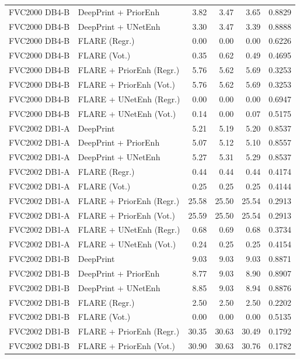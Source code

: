 {\begin{longtable}{llrrrr}
FVC2000 DB4-B & DeepPrint + PriorEnh & 3.82 & 3.47 & 3.65 & 0.8829 \\
FVC2000 DB4-B & DeepPrint + UNetEnh & 3.30 & 3.47 & 3.39 & 0.8888 \\
FVC2000 DB4-B & FLARE (Regr.) & 0.00 & 0.00 & 0.00 & 0.6226 \\
FVC2000 DB4-B & FLARE (Vot.) & 0.35 & 0.62 & 0.49 & 0.4695 \\
FVC2000 DB4-B & FLARE + PriorEnh (Regr.) & 5.76 & 5.62 & 5.69 & 0.3253 \\
FVC2000 DB4-B & FLARE + PriorEnh (Vot.) & 5.76 & 5.62 & 5.69 & 0.3253 \\
FVC2000 DB4-B & FLARE + UNetEnh (Regr.) & 0.00 & 0.00 & 0.00 & 0.6947 \\
FVC2000 DB4-B & FLARE + UNetEnh (Vot.) & 0.14 & 0.00 & 0.07 & 0.5175 \\
\midrule
FVC2002 DB1-A & DeepPrint & 5.21 & 5.19 & 5.20 & 0.8537 \\
FVC2002 DB1-A & DeepPrint + PriorEnh & 5.07 & 5.12 & 5.10 & 0.8557 \\
FVC2002 DB1-A & DeepPrint + UNetEnh & 5.27 & 5.31 & 5.29 & 0.8537 \\
FVC2002 DB1-A & FLARE (Regr.) & 0.44 & 0.44 & 0.44 & 0.4174 \\
FVC2002 DB1-A & FLARE (Vot.) & 0.25 & 0.25 & 0.25 & 0.4144 \\
FVC2002 DB1-A & FLARE + PriorEnh (Regr.) & 25.58 & 25.50 & 25.54 & 0.2913 \\
FVC2002 DB1-A & FLARE + PriorEnh (Vot.) & 25.59 & 25.50 & 25.54 & 0.2913 \\
FVC2002 DB1-A & FLARE + UNetEnh (Regr.) & 0.68 & 0.69 & 0.68 & 0.3734 \\
FVC2002 DB1-A & FLARE + UNetEnh (Vot.) & 0.24 & 0.25 & 0.25 & 0.4154 \\
\midrule
FVC2002 DB1-B & DeepPrint & 9.03 & 9.03 & 9.03 & 0.8871 \\
FVC2002 DB1-B & DeepPrint + PriorEnh & 8.77 & 9.03 & 8.90 & 0.8907 \\
FVC2002 DB1-B & DeepPrint + UNetEnh & 8.85 & 9.03 & 8.94 & 0.8876 \\
FVC2002 DB1-B & FLARE (Regr.) & 2.50 & 2.50 & 2.50 & 0.2202 \\
FVC2002 DB1-B & FLARE (Vot.) & 0.00 & 0.00 & 0.00 & 0.5135 \\
FVC2002 DB1-B & FLARE + PriorEnh (Regr.) & 30.35 & 30.63 & 30.49 & 0.1792 \\
FVC2002 DB1-B & FLARE + PriorEnh (Vot.) & 30.90 & 30.63 & 30.76 & 0.1782 \\

\end{longtable}}
